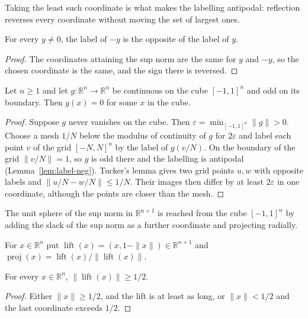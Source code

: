 Taking the least such coordinate is what makes the labelling antipodal: reflection
reverses every coordinate without moving the set of largest ones.

\begin{lemma}
\label{lem:label-neg}
\leanok
{}
For every $y \neq 0$, the label of $-y$ is the opposite of the label of $y$.
\end{lemma}
\begin{proof}
\leanok
The coordinates attaining the sup norm are the same for $y$ and $-y$, so the chosen
coordinate is the same, and the sign there is reversed.
\end{proof}

\begin{theorem}
\label{thm:borsuk-cube}
\leanok
{}
Let $n \ge 1$ and let $g : \mathbb{R}^n \to \mathbb{R}^n$ be continuous on the cube
$[-1, 1]^n$ and odd on its boundary. Then $g(x) = 0$ for some $x$ in the cube.
\end{theorem}
\begin{proof}
\leanok
{}
Suppose $g$ never vanishes on the cube. Then $\varepsilon = \min_{[-1,1]^n} \|g\| > 0$.
Choose a mesh $1/N$ below the modulus of continuity of $g$ for $2\varepsilon$ and label
each point $v$ of the grid $[-N, N]^n$ by the label of $g(v/N)$. On the boundary of the
grid $\|v/N\| = 1$, so $g$ is odd there and the labelling is antipodal
(Lemma~\ref{lem:label-neg}). Tucker's lemma gives two grid points $u, w$ with opposite
labels and $\|u/N - w/N\| \le 1/N$. Their images then differ by at least $2\varepsilon$
in one coordinate, although the points are closer than the mesh.
\end{proof}

The unit sphere of the sup norm in $\mathbb{R}^{n+1}$ is reached from the cube
$[-1, 1]^n$ by adding the slack of the sup norm as a further coordinate and projecting
radially.

\begin{definition}
\label{def:lift}
\leanok
For $x \in \mathbb{R}^n$ put $\operatorname{lift}(x) = (x, 1 - \|x\|) \in
\mathbb{R}^{n+1}$ and
$\operatorname{proj}(x) = \operatorname{lift}(x) / \|\operatorname{lift}(x)\|$.
\end{definition}

\begin{lemma}
\label{lem:lift-pos}
\leanok
{}
For every $x \in \mathbb{R}^n$, $\|\operatorname{lift}(x)\| \ge 1/2$.
\end{lemma}
\begin{proof}
\leanok
Either $\|x\| \ge 1/2$, and the lift is at least as long, or $\|x\| < 1/2$ and the last
coordinate exceeds $1/2$.
\end{proof}

